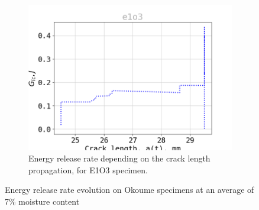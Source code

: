 \begin{figure}[H]
\begin{subfigure}{0.48\linewidth}
	\centering
	\includegraphics[scale=0.3]{Figures/e1o3_G}
	\decoRule
	\caption[Energy release rate E1O3]{Energy release rate depending on the crack length propagation, for E1O3 specimen.}
	\label{fig:E1O3_G}
\end{subfigure}
\caption{Energy release rate evolution on Okoume specimens at an average of 7\% moisture content}
\label{E1o_G}
\end{figure}


